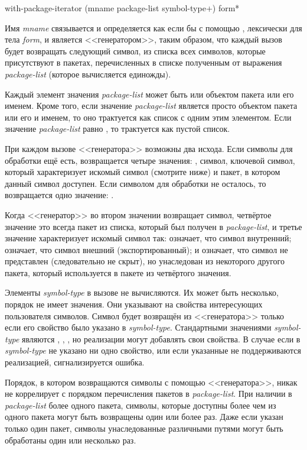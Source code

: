 \begin{defmac}
with-package-iterator (mname package-list {symbol-type}+)
                      {form}*

Имя \emph{mname} связывается и определяется как если бы с помощью
, лексически для тела \emph{form}, и является
<<генератором>>, таким образом, что каждый вызов 
будет возвращать следующий символ, из списка всех символов, которые
присутствуют в пакетах, перечисленных в списке полученным от выражения
\emph{package-list} (которое вычисляется единожды).

Каждый элемент значения \emph{package-list} может быть или объектом
пакета или его именем. Кроме того, если значение \emph{package-list}
является просто объектом пакета или его и именем, то оно трактуется
как список с одним этим элементом. Если значение \emph{package-list}
равно , то трактуется как пустой список.

При каждом вызове <<генератора>> возможны два исхода.
Если символы для обработки ещё есть, возвращается четыре значения:
, символ, ключевой символ, который характеризует искомый символ
(смотрите ниже) и пакет, в котором данный символ доступен.
Если символом для обработки не осталось, то возвращается одно
значение: .

Когда <<генератор>> во втором значении возвращает символ, четвёртое
значение это всегда пакет из списка, который был получен в
\emph{package-list}, и третье значение характеризует искомый символ
так:
 означает, что символ внутренний;
 означает, что символ внешний (экспортированный);
и  означает, что символ не представлен (следовательно
не скрыт), но унаследован из некоторого другого пакета, который
используется в пакете из четвёртого значения.

Элементы \emph{symbol-type} в вызове  не
вычисляются. Их может быть несколько, порядок не имеет значения. Они
указывают на свойства интересующих пользователя символов.
Символ будет возвращён из <<генератора>> только если его свойство было
указано в \emph{symbol-type}. Стандартными значениями
\emph{symbol-type} являются , ,
, но реализации могут добавлять свои свойства. В случае
если в \emph{symbol-type} не указано ни одно свойство, или если
указанные не поддерживаются реализацией, сигнализируется ошибка.

Порядок, в котором возвращаются символы с помощью <<генератора>>,
никак не коррелирует с порядком перечисления пакетов в
\emph{package-list}.
При наличии в \emph{package-list} более одного пакета, символы,
которые доступны более чем из одного пакета могут быть возвращены один
или более раз. Даже если указан только один пакет, символы
унаследованные различными путями могут быть обработаны один или
несколько раз.


\end{defmac}
